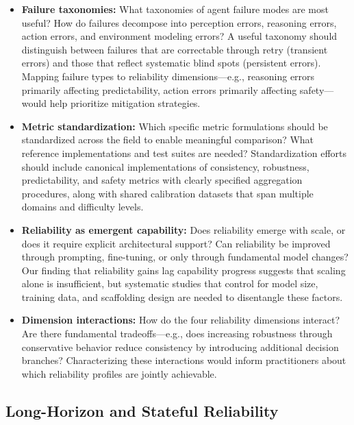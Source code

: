 \documentclass[11pt]{article}
\newcounter{dimension}
\begin{document}
\begin{itemize}[leftmargin=*]
    \item \textbf{Failure taxonomies:} What taxonomies of agent failure modes are most useful?
    How do failures decompose into perception errors, reasoning errors, action errors, and environment modeling errors?
    A useful taxonomy should distinguish between failures that are correctable through retry (transient errors) and those that reflect systematic blind spots (persistent errors).
    Mapping failure types to reliability dimensions---e.g., reasoning errors primarily affecting predictability, action errors primarily affecting safety---would help prioritize mitigation strategies.

    \item \textbf{Metric standardization:} Which specific metric formulations should be standardized across the field to enable meaningful comparison?
    What reference implementations and test suites are needed?
    Standardization efforts should include canonical implementations of consistency, robustness, predictability, and safety metrics with clearly specified aggregation procedures, along with shared calibration datasets that span multiple domains and difficulty levels.

    \item \textbf{Reliability as emergent capability:} Does reliability emerge with scale, or does it require explicit architectural support?
    Can reliability be improved through prompting, fine-tuning, or only through fundamental model changes?
    Our finding that reliability gains lag capability progress suggests that scaling alone is insufficient, but systematic studies that control for model size, training data, and scaffolding design are needed to disentangle these factors.

    \item \textbf{Dimension interactions:} How do the four reliability dimensions interact?
    Are there fundamental tradeoffs---e.g., does increasing robustness through conservative behavior reduce consistency by introducing additional decision branches?
    Characterizing these interactions would inform practitioners about which reliability profiles are jointly achievable.
\end{itemize}

\subsection{Long-Horizon and Stateful Reliability}
\end{document}
